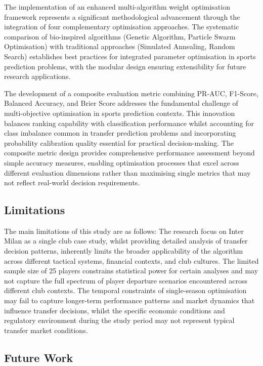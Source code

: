 The implementation of an enhanced multi-algorithm weight optimisation framework represents a significant methodological advancement through the integration of four complementary optimisation approaches. The systematic comparison of bio-inspired algorithms (Genetic Algorithm, Particle Swarm Optimisation) with traditional approaches (Simulated Annealing, Random Search) establishes best practices for integrated parameter optimisation in sports prediction problems, with the modular design ensuring extensibility for future research applications.

The development of a composite evaluation metric combining PR-AUC, F1-Score, Balanced Accuracy, and Brier Score addresses the fundamental challenge of multi-objective optimisation in sports prediction contexts. This innovation balances ranking capability with classification performance whilst accounting for class imbalance common in transfer prediction problems and incorporating probability calibration quality essential for practical decision-making. The composite metric design provides comprehensive performance assessment beyond simple accuracy measures, enabling optimisation processes that excel across different evaluation dimensions rather than maximising single metrics that may not reflect real-world decision requirements.

\subsection{Limitations}

The main limitations of this study are as follows: The research focus on Inter Milan as a single club case study, whilst providing detailed analysis of transfer decision patterns, inherently limits the broader applicability of the algorithm across different tactical systems, financial contexts, and club cultures. The limited sample size of 25 players constrains statistical power for certain analyses and may not capture the full spectrum of player departure scenarios encountered across different club contexts. The temporal constraints of single-season optimisation may fail to capture longer-term performance patterns and market dynamics that influence transfer decisions, whilst the specific economic conditions and regulatory environment during the study period may not represent typical transfer market conditions.

\subsection{Future Work}

